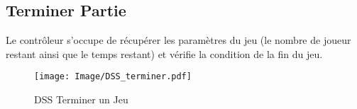 \subsection{Terminer Partie}

Le contrôleur s'occupe de récupérer les paramètres du jeu (le nombre 
de joueur restant ainsi que le temps restant) et vérifie la condition 
de la fin du jeu.
\begin{figure}[h!]
	\centering 
	\texttt{[image: Image/DSS\_terminer.pdf]}
	\caption{DSS Terminer un Jeu}
\end{figure}
\newpage
	

